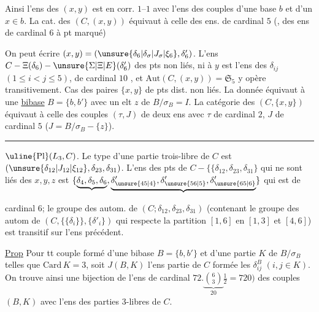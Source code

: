 Ainsi l'ens des   $(x,y)$  est en corr. $1$--$1$ avec l'ens des couples d'une base $b$ et d'un $x\in b$. La cat. des $(C,(x,y))$ équivaut à celle des ens. de cardinal $5$ (, des ens de cardinal $6$ à pt marqué)

On peut écrire $(x,y)=(\unsure{\delta_6|\delta_\sigma|J_\sigma|\xi_6},\delta'_6)$. L'ens $C-\Xi(\delta_6)-\unsure{\Sigma|\Xi|E}(\delta'_6)$  des pts  non liés, ni à $y$ est l'ens des $\delta_{ij}$ $(1\leq i<j\leq5)$, de cardinal $10$ , et $\mathrm{Aut}(C,(x,y))=\mathfrak S_5$ y opère transitivement.
Cas des paires $\{x,y\}$ de pts dist. non liés. La donnée équivaut à une \uline{bibase} $B=\{b,b'\}$ avec un elt $z$ de $B/\sigma_B=I$. La catégorie des $(C,\{x,y\})$ équivaut à celle des couples $(\tau,J)$ de deux ens avec $\tau$ de cardinal $2$,  $J$ de cardinal $5$ ($J=B/\sigma_B-\{z\}$).
\noindent\rule{2.3cm}{.4pt}

$\uline{\mathrm{Pl}}(L_3,C)$. Le type d'une partie  trois-libre  de $C$ est $(\unsure{\delta_{12}|J_{12}|\xi_{12}},\delta_{23},\delta_{31})$. L'ens des pts de $C-\{\{\delta_{12},\delta_{23},\delta_{31}\}$ qui ne sont  liés   des $x,y,z$ est $\{\underbrace{\delta_4,\delta_5,\delta_6},\underbrace{\delta'_{\unsure{45|4}},\delta'_{\unsure{56|5}},\delta'_{\unsure{65|6}}}\}$ qui est de

cardinal $6$; le groupe des autom. de $(C;\delta_{12},\delta_{23},\delta_{31})$ (contenant le groupe des autom de $(C,\{\{\delta_i\}\},\{\delta'_i\})$ qui respecte la partition  $[1,6]$ en $[1,3]$ et $[4,6]$) est transitif sur l'ens précédent.

\uline{Prop} Pour tt couple  formé d'une bibase $B=\{b,b'\}$  et d'une partie $K$ de $B/\sigma_B$ telles que $\mathrm{Card}\,K=3$, soit $J(B,K)$ l'ens partie de $C$ formée les $\delta^B_{ij}$ $(i,j\in K)$. On trouve ainsi une bijection de l'ens  de cardinal $72.\underbrace{\binom{6}{3}}_{20}\frac{1}{2}=720)$ des couples $(B,K)$ avec l'ens des parties $3$-libres de $C$.

